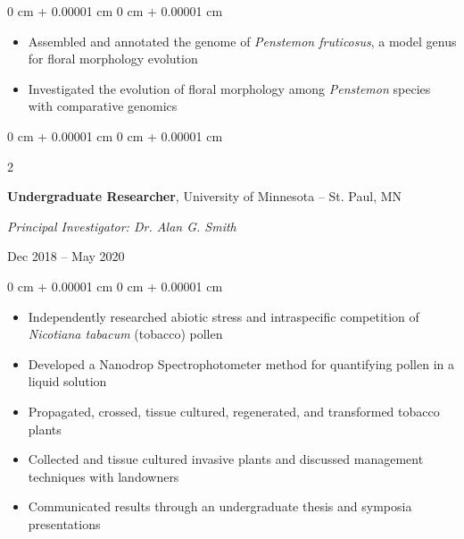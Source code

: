 \documentclass[10pt, letterpaper]{article}
\newenvironment{highlights}{
    \begin{itemize}[
        topsep=0.10 cm,
        parsep=0.10 cm,
        partopsep=0pt,
        itemsep=0pt,
        leftmargin=0 cm + 10pt
    ]
}{
    \end{itemize}
} %
\newenvironment{onecolentry}{
    \begin{adjustwidth}{
        0 cm + 0.00001 cm
    }{
        0 cm + 0.00001 cm
    }
}{
    \end{adjustwidth}
} %
\newenvironment{twocolentry}[2][]{
    \onecolentry
    \def\secondColumn{#2}
    \setcolumnwidth{\fill, 4.5 cm}
    \begin{paracol}{2}
}{
    \switchcolumn \raggedleft \secondColumn
    \end{paracol}
    \endonecolentry
} %
\begin{document}
        \begin{onecolentry}
            \begin{highlights}
                \item Assembled and annotated the genome of \textit{Penstemon fruticosus}, a model genus for floral morphology evolution
                \item Investigated the evolution of floral morphology among \textit{Penstemon} species with comparative genomics
            \end{highlights}
        \end{onecolentry}


        \vspace{0.2 cm}
        

        \begin{samepage} 
            \begin{twocolentry}{
                Dec 2018 – May 2020
                }
                \textbf{Undergraduate Researcher}, University of Minnesota -- St. Paul, MN
                
                \vspace{0.05 cm}

                \textit{Principal Investigator: Dr. Alan G. Smith}
            \end{twocolentry}
        \end{samepage}            

        \vspace{0.10 cm}
        
        \begin{onecolentry}
            \begin{highlights}
                \item Independently researched abiotic stress and intraspecific competition of \textit{Nicotiana tabacum} (tobacco) pollen
                \item Developed a Nanodrop Spectrophotometer method for quantifying pollen in a liquid solution
                \item Propagated, crossed, tissue cultured, regenerated, and transformed tobacco plants
                \item Collected and tissue cultured invasive plants and discussed management techniques with landowners
                \item Communicated results through an undergraduate thesis and symposia presentations             
            \end{highlights}
        \end{onecolentry}
\end{document}
